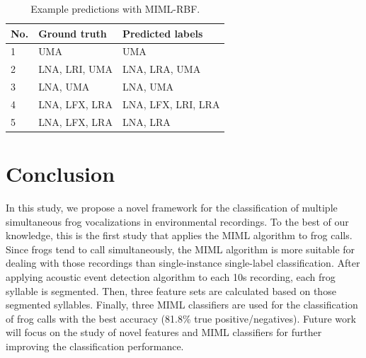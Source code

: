 \begin{table}[htb!]
\centering
\caption{Example predictions with MIML-RBF.}
\label{tab:prediction}
\begin{tabular}{lll}
\hline\hline
{\bf No.} &{\bf Ground truth} & {\bf Predicted labels} \\ \hline
1&UMA                & UMA                    \\ 
2&LNA, LRI, UMA      & LNA, LRA, UMA          \\ 
3&LNA, UMA           & LNA, UMA               \\ 
4&LNA, LFX, LRA      & LNA, LFX, LRI, LRA     \\ 
5&LNA, LFX, LRA      & LNA, LRA               \\ \hline\hline
\end{tabular}
\end{table}




\section{Conclusion}
In this study, we propose a novel framework for the classification of multiple simultaneous frog vocalizations in environmental recordings. To the best of our knowledge, this is the first study that applies the MIML algorithm to frog calls. Since frogs tend to call simultaneously, the MIML algorithm is more suitable for dealing with those recordings than single-instance single-label classification. After applying acoustic event detection algorithm to each 10s recording, each frog syllable is segmented. Then, three feature sets are calculated based on those segmented syllables. Finally, three MIML classifiers are used for the classification of frog calls with the best accuracy (81.8\% true positive/negatives). Future work will focus on the study of novel features and MIML classifiers for further improving the classification performance.   


